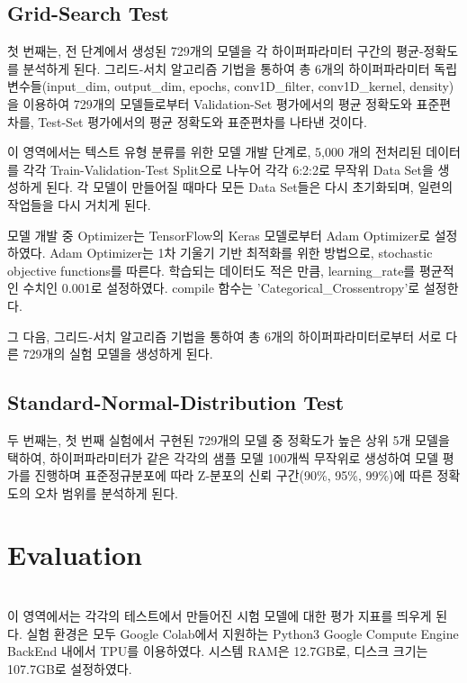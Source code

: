 \documentclass{jcse}
\begin{document}
\subsection{Grid-Search Test}
첫 번째는, 전 단계에서 생성된 729개의 모델을 각 하이퍼파라미터 구간의 평균-정확도를 분석하게 된다.
그리드-서치 알고리즘 기법을 통하여 총 6개의 하이퍼파라미터 독립 변수들(input\_dim, output\_dim, epochs, conv1D\_filter, conv1D\_kernel, density)을 이용하여 729개의 모델들로부터 Validation-Set 평가에서의 평균 정확도와 표준편차를, Test-Set 평가에서의 평균 정확도와 표준편차를 나타낸 것이다.

이 영역에서는 텍스트 유형 분류를 위한 모델 개발 단계로, 5,000 개의 전처리된 데이터를 각각 Train-Validation-Test Split으로 나누어 각각 6:2:2로 무작위 Data Set\cite{cite:SimpleRandeomSampling}을 생성하게 된다. 각 모델이 만들어질 때마다 모든 Data Set들은 다시 초기화\cite{cite:SamplingMethods}되며, 일련의 작업들을 다시 거치게 된다.

모델 개발 중 Optimizer\cite{cite:OptimizingforCNN}는 TensorFlow의 Keras 모델로부터 Adam Optimizer로 설정하였다. Adam Optimizer는 1차 기울기 기반 최적화를 위한 방법으로, stochastic objective functions\cite{cite:kingma2017adam}를 따른다. 학습되는 데이터도 적은 만큼, learning\_rate를 평균적인 수치인 0.001로 설정하였다. compile 함수는 'Categorical\_Crossentropy'로 설정한다.

그 다음, 그리드-서치 알고리즘 기법을 통하여 총 6개의 하이퍼파라미터로부터 서로 다른 729개의 실험 모델을 생성하게 된다. 

\subsection{Standard-Normal-Distribution Test}
두 번째는, 첫 번째 실험에서 구현된 729개의 모델 중 정확도가 높은 상위 5개 모델을 택하여, 하이퍼파라미터가 같은 각각의 샘플 모델 100개씩 무작위로 생성하여 모델 평가를 진행하며 표준정규분포\cite{cite:NormalDistribution}에 따라 Z-분포의 신뢰 구간(90\%, 95\%, 99\%)에 따른 정확도의 오차 범위를 분석하게 된다.


\section{Evaluation}
\\
이 영역에서는 각각의 테스트에서 만들어진 시험 모델에 대한 평가 지표를 띄우게 된다.
실험 환경은 모두 Google Colab에서 지원하는 Python3 Google Compute Engine BackEnd 내에서 TPU를 이용하였다.
시스템 RAM은 12.7GB로, 디스크 크기는 107.7GB로 설정하였다.
\end{document}
